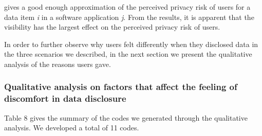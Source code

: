 \documentclass[10pt]{article}
\begin{document}
gives a good enough approximation of the perceived privacy risk of users for a data item \textit {i} in a software application \textit {j}. From the results, it is apparent that the visibility has the largest effect on the perceived privacy risk of users. 

In order to further observe why users felt differently when they disclosed data in the three scenarios we described, in the next section we present the qualitative analysis of the reasons users gave.

\subsubsection{Qualitative analysis on factors that affect the feeling of discomfort in data disclosure}

Table 8 gives the summary of the codes we generated through the qualitative analysis. We developed a total of 11 codes.
\end{document}
